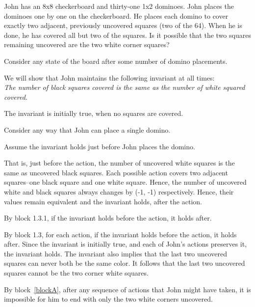 \documentclass[11pt]{article}
\begin{document}
\begin{problems}


\problem

\begin{theorem}[Checkerboard]
  John has an 8x8 checkerboard and thirty-one 1x2 dominoes. John places the dominoes one by one 
    on the checkerboard. He places each domino to cover exactly two adjacent, previously uncovered 
    squares (two of the 64). When he is done, he has covered all but two of the squares. Is it 
    possible that the two squares remaining uncovered are the two white corner squares?
\end{theorem}
\begin{longFormProof}
  \begin{block}[blockA]
    {Consider any state of the board after some number of domino placements.}
    
    \step We will show that John maintains the following invariant at all times:\\
    \textit{The number of black squares covered is the same as the number of white squared covered.}

    \step The invariant is initially true, when no squares are covered.

    \begin{block}[blockB] 
    {Consider any way that John can place a single domino.}

      \begin{block}[blockC]
      {Assume the invariant holds just before John places the domino.}

        \step That is, just before the action, the number of uncovered white squares is the same as uncovered black squares.
        \step Each possible action covers two adjacent squares--one black square and one white square.
        \step Hence, the number of uncovered white and black squares always changes by (-1, -1) respectively.
        \step Hence, their values remain equivalent and the invariant holds, after the action.

      \end{block}

      \step By block 1.3.1, if the invariant holds before the action, it holds after.

    \end{block}

    \step By block 1.3, for each action, if the invariant holds before the action, it holds after.
    \step Since the invariant is initially true, and each of John's actions preserves it, the invariant holds.
    \step The invariant also implies that the last two uncovered squares can never both be the same color.
    \step It follows that the last two uncovered squares cannot be the two corner white squares.

  \end{block}

  \step By block~\ref{blockA}, after any sequence of actions that John might have taken, it is impossible for him to end with only the two white corners uncovered.
\end{longFormProof}


\end{problems}
\end{document}
